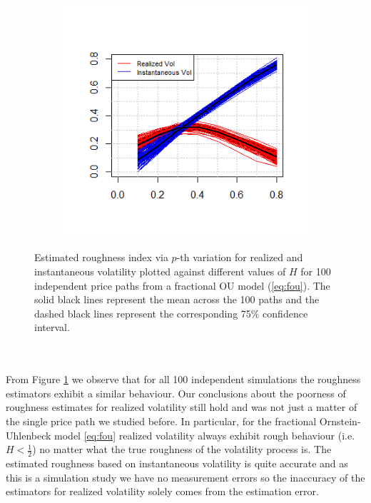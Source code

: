\documentclass{article}
\begin{document}
\begin{figure}[htbp]
    \centering
    
    \begin{subfigure}{0.78\textwidth}
        \includegraphics[width=\linewidth]{ex7_plot100.png}
    \end{subfigure}
    
    \caption{Estimated roughness index via $p$-th variation for realized and instantaneous volatility plotted against different values of $H$ for 100 independent price paths from a fractional OU model (\ref{eq:fou}). The solid black lines represent the mean across the 100 paths and the dashed black lines represent the corresponding 75\% confidence interval.}
    \label{fig:ex7plot100}
\end{figure}\\\\
From Figure \ref{fig:ex7plot100} we observe that for all 100 independent simulations the roughness estimators exhibit a similar behaviour. Our conclusions about the poorness of roughness estimates for realized volatility still hold and was not just a matter of the single price path we studied before. In particular, for the fractional Ornstein-Uhlenbeck model \eqref{eq:fou} realized volatility always exhibit rough behaviour (i.e. $H<\frac{1}{2}$) no matter what the true roughness of the volatility process is. The estimated roughness based on instantaneous volatility is quite accurate and as this is a simulation study we have no measurement errors so the inaccuracy of the estimators for realized volatility solely comes from the estimation error. \\\\
\end{document}
